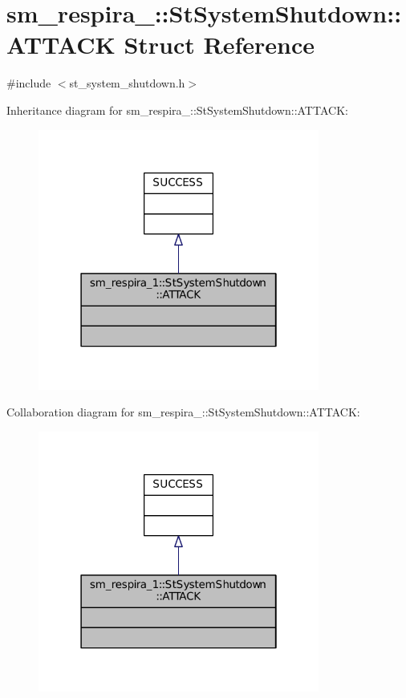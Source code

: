 \hypertarget{structsm__respira__1_1_1StSystemShutdown_1_1ATTACK}{}\section{sm\+\_\+respira\+\_\+:\+:St\+System\+Shutdown\+:\+:A\+T\+T\+A\+CK Struct Reference}
\label{structsm__respira__1_1_1StSystemShutdown_1_1ATTACK}


{\ttfamily \#include $<$st\+\_\+system\+\_\+shutdown.\+h$>$}



Inheritance diagram for sm\+\_\+respira\+\_\+:\+:St\+System\+Shutdown\+:\+:A\+T\+T\+A\+CK\+:
\nopagebreak
\begin{figure}[H]
\begin{center}
\leavevmode
\includegraphics[width=262pt]{structsm__respira__1_1_1StSystemShutdown_1_1ATTACK__inherit__graph}
\end{center}
\end{figure}


Collaboration diagram for sm\+\_\+respira\+\_\+:\+:St\+System\+Shutdown\+:\+:A\+T\+T\+A\+CK\+:
\nopagebreak
\begin{figure}[H]
\begin{center}
\leavevmode
\includegraphics[width=262pt]{structsm__respira__1_1_1StSystemShutdown_1_1ATTACK__coll__graph}
\end{center}
\end{figure}


